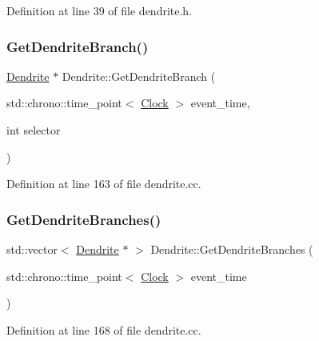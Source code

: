 Definition at line 39 of file dendrite.\+h.

\mbox{\label{class_dendrite_a1465037ca014fa8bbefc8c0ad70d1647}} 
\subsubsection{\texorpdfstring{Get\+Dendrite\+Branch()}{GetDendriteBranch()}}
{\footnotesize\ttfamily \mbox{\hyperlink{class_dendrite}{Dendrite}} $\ast$ Dendrite\+::\+Get\+Dendrite\+Branch (\begin{DoxyParamCaption}\item[{std\+::chrono\+::time\+\_\+point$<$ \mbox{\hyperlink{universe_8h_a0ef8d951d1ca5ab3cfaf7ab4c7a6fd80}{Clock}} $>$}]{event\+\_\+time,  }\item[{int}]{selector }\end{DoxyParamCaption})}



Definition at line 163 of file dendrite.\+cc.

\mbox{\label{class_dendrite_a00b524d47e3662df712ea060ebadca77}} 
\subsubsection{\texorpdfstring{Get\+Dendrite\+Branches()}{GetDendriteBranches()}}
{\footnotesize\ttfamily std\+::vector$<$ \mbox{\hyperlink{class_dendrite}{Dendrite}} $\ast$ $>$ Dendrite\+::\+Get\+Dendrite\+Branches (\begin{DoxyParamCaption}\item[{std\+::chrono\+::time\+\_\+point$<$ \mbox{\hyperlink{universe_8h_a0ef8d951d1ca5ab3cfaf7ab4c7a6fd80}{Clock}} $>$}]{event\+\_\+time }\end{DoxyParamCaption})}



Definition at line 168 of file dendrite.\+cc.

\mbox{\label{class_dendrite_a2c46d2612d09964a473e1de99c17fa13}} 
